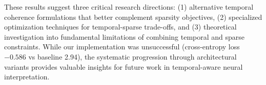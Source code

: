 These results suggest three critical research directions: (1) alternative temporal coherence formulations that better complement sparsity objectives, (2) specialized optimization techniques for temporal-sparse trade-offs, and (3) theoretical investigation into fundamental limitations of combining temporal and sparse constraints. While our implementation was unsuccessful (cross-entropy loss $-0.586$ vs baseline 2.94), the systematic progression through architectural variants provides valuable insights for future work in temporal-aware neural interpretation.
